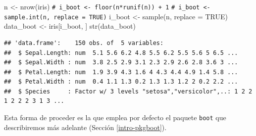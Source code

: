 \documentclass[
]{book}
\newenvironment{Shaded}{\begin{snugshade}}{\end{snugshade}}
\newcommand{\AttributeTok}[1]{\textcolor[rgb]{0.77,0.63,0.00}{#1}}
\newcommand{\CommentTok}[1]{\textcolor[rgb]{0.56,0.35,0.01}{\textit{#1}}}
\newcommand{\ConstantTok}[1]{\textcolor[rgb]{0.00,0.00,0.00}{#1}}
\newcommand{\FunctionTok}[1]{\textcolor[rgb]{0.00,0.00,0.00}{#1}}
\newcommand{\NormalTok}[1]{#1}
\newcommand{\OtherTok}[1]{\textcolor[rgb]{0.56,0.35,0.01}{#1}}
\theoremstyle{break}
\theoremstyle{nonumberplain}
\renewcommand{\CommentTok}[1]{\textcolor[rgb]{0.41,0.41,0.41}{\texttt{#1}}}
\begin{document}
\begin{Shaded}
\begin{Highlighting}[]
\NormalTok{n }\OtherTok{\textless{}{-}} \FunctionTok{nrow}\NormalTok{(iris)}
\CommentTok{\# i\_boot \textless{}{-} floor(n*runif(n)) + 1}
\CommentTok{\# i\_boot \textless{}{-} sample.int(n, replace = TRUE)}
\NormalTok{i\_boot }\OtherTok{\textless{}{-}} \FunctionTok{sample}\NormalTok{(n, }\AttributeTok{replace =} \ConstantTok{TRUE}\NormalTok{)}
\NormalTok{data\_boot }\OtherTok{\textless{}{-}}\NormalTok{ iris[i\_boot, ]}
\FunctionTok{str}\NormalTok{(data\_boot)}
\end{Highlighting}
\end{Shaded}

\begin{verbatim}
## 'data.frame':    150 obs. of  5 variables:
##  $ Sepal.Length: num  5.1 5.6 6.2 4.8 5.5 6.2 5.5 5.6 5 6.5 ...
##  $ Sepal.Width : num  3.8 2.5 2.9 3.1 2.3 2.9 2.6 2.8 3.6 3 ...
##  $ Petal.Length: num  1.9 3.9 4.3 1.6 4 4.3 4.4 4.9 1.4 5.8 ...
##  $ Petal.Width : num  0.4 1.1 1.3 0.2 1.3 1.3 1.2 2 0.2 2.2 ...
##  $ Species     : Factor w/ 3 levels "setosa","versicolor",..: 1 2 2 1 2 2 2 3 1 3 ...
\end{verbatim}

Esta forma de proceder es la que emplea por defecto el paquete \texttt{boot} que describiremos más adelante (Sección \ref{intro-pkgboot}).
\end{document}
